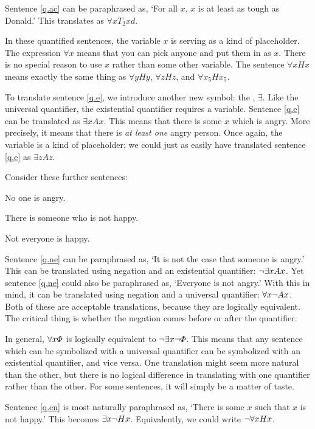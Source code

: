 Sentence \ref{q.ac} can be paraphrased as, `For all $x$, $x$ is at least as tough as Donald.' This translates as $\forall x T_2xd$.

In these quantified sentences, the variable $x$ is serving as a kind of placeholder. The expression $\forall x$ means that you can pick anyone and put them in as $x$. There is no special reason to use $x$ rather than some other variable. The sentence $\forall x Hx$ means exactly the same thing as $\forall y Hy$, $\forall z Hz$, and $\forall x_5 Hx_5$.

To translate sentence \ref{q.e}, we introduce another new symbol: the , $\exists$. Like the universal quantifier, the existential quantifier requires a variable. Sentence \ref{q.e} can be translated as $\exists x Ax$. This means that there is some $x$ which is angry. More precisely, it means that there is \emph{at least one} angry person. Once again, the variable is a kind of placeholder; we could just as easily have translated sentence \ref{q.e} as $\exists z Az$.

Consider these further sentences:
\begin{earg}
\item[\ex{q.ne}] No one is angry.
\item[\ex{q.en}] There is someone who is not happy.
\item[\ex{q.na}] Not everyone is happy.
\end{earg}

Sentence \ref{q.ne} can be paraphrased as, `It is not the case that someone is angry.' This can be translated using negation and an existential quantifier: $\neg \exists x Ax$. Yet sentence \ref{q.ne} could also be paraphrased as, `Everyone is not angry.' With this in mind, it can be translated using negation and a universal quantifier: $\forall x \neg Ax$. Both of these are acceptable translations, because they are logically equivalent. The critical thing is whether the negation comes before or after the quantifier.

In general, $\forall x\varPhi{}$ is logically equivalent to $\neg\exists x\neg\varPhi{}$. This means that any sentence which can be symbolized with a universal quantifier can be symbolized with an existential quantifier, and vice versa. One translation might seem more natural than the other, but there is no logical difference in translating with one quantifier rather than the other. For some sentences, it will simply be a matter of taste.

Sentence \ref{q.en} is most naturally paraphrased as, `There is some $x$ such that $x$ is not happy.' This becomes $\exists x \neg Hx$. Equivalently, we could write $\neg\forall x Hx$.


